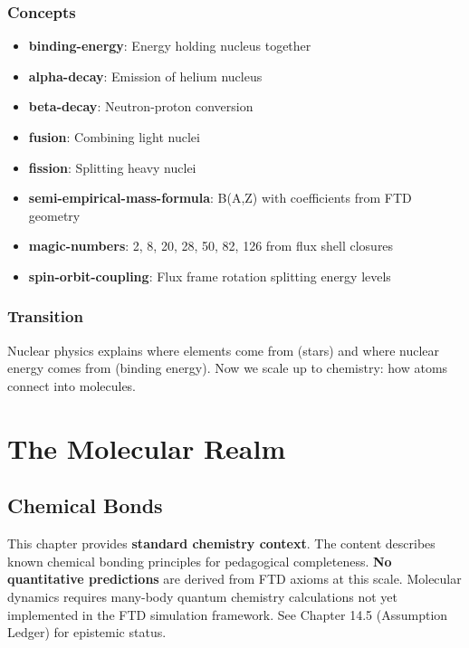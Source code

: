 \documentclass[
  11pt,
  letterpaper,
  twoside,
  openright]{book}
\providecommand{\tightlist}{%
  \setlength{\itemsep}{0pt}\setlength{\parskip}{0pt}}
\begin{document}
\section{Concepts}\label{concepts-3}

\begin{itemize}
\tightlist
\item
  \textbf{binding-energy}: Energy holding nucleus together
\item
  \textbf{alpha-decay}: Emission of helium nucleus
\item
  \textbf{beta-decay}: Neutron-proton conversion
\item
  \textbf{fusion}: Combining light nuclei
\item
  \textbf{fission}: Splitting heavy nuclei
\item
  \textbf{semi-empirical-mass-formula}: B(A,Z) with coefficients from
  FTD geometry
\item
  \textbf{magic-numbers}: 2, 8, 20, 28, 50, 82, 126 from flux shell
  closures
\item
  \textbf{spin-orbit-coupling}: Flux frame rotation splitting energy
  levels
\end{itemize}

\section{Transition}\label{transition-3}

Nuclear physics explains where elements come from (stars) and where
nuclear energy comes from (binding energy). Now we scale up to
chemistry: how atoms connect into molecules.

\part{The Molecular Realm}

\chapter{Chemical Bonds}\label{sec-chemical-bonds}

\begin{tcolorbox}[enhanced jigsaw, leftrule=.75mm, title=\textcolor{quarto-callout-warning-color}{\faExclamationTriangle}\hspace{0.5em}{Pedagogical Context {[}NOT DERIVED FROM FTD{]}}, bottomrule=.15mm, opacityback=0, coltitle=black, arc=.35mm, colframe=quarto-callout-warning-color-frame, colbacktitle=quarto-callout-warning-color!10!white, colback=white, titlerule=0mm, breakable, bottomtitle=1mm, toptitle=1mm, rightrule=.15mm, toprule=.15mm, left=2mm, opacitybacktitle=0.6]

This chapter provides \textbf{standard chemistry context}. The content
describes known chemical bonding principles for pedagogical
completeness. \textbf{No quantitative predictions} are derived from FTD
axioms at this scale. Molecular dynamics requires many-body quantum
chemistry calculations not yet implemented in the FTD simulation
framework. See Chapter 14.5 (Assumption Ledger) for epistemic status.

\end{tcolorbox}
\end{document}
